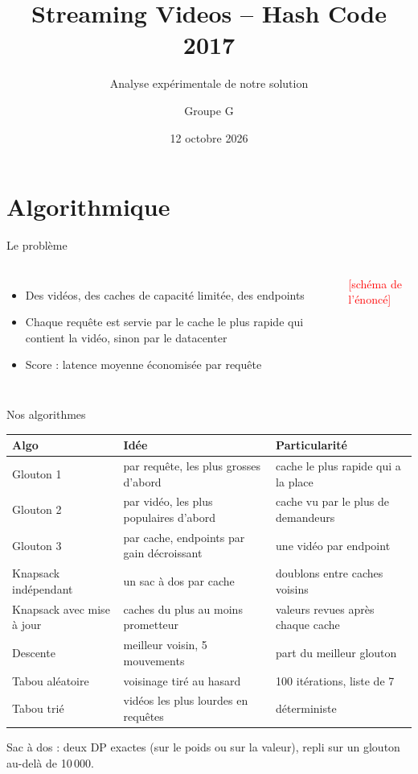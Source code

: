 \documentclass[aspectratio=169,11pt]{beamer}
\title{Streaming Videos -- Hash Code 2017}
\subtitle{Analyse expérimentale de notre solution}
\author{Groupe G \\ \afaire{noms}}
\date{12 octobre 2026}
\newcommand{\afaire}[1]{\textcolor{red}{[#1]}}
\begin{document}
\begin{frame}
  \titlepage
\end{frame}

\section{Algorithmique}

\begin{frame}{Le problème}
  \begin{columns}
    \begin{itemize}
      \item Des vidéos, des caches de capacité limitée, des endpoints
      \item Chaque requête est servie par le cache le plus rapide qui contient la vidéo, sinon par le datacenter
      \item Score : latence moyenne économisée par requête
    \end{itemize}
    \afaire{schéma de l'énoncé}
  \end{columns}
\end{frame}

\begin{frame}{Nos algorithmes}
  \small
  \begin{tabular}{@{}lll@{}}
    \toprule
    Algo & Idée & Particularité \\
    \midrule
    Glouton 1 & par requête, les plus grosses d'abord & cache le plus rapide qui a la place \\
    Glouton 2 & par vidéo, les plus populaires d'abord & cache vu par le plus de demandeurs \\
    Glouton 3 & par cache, endpoints par gain décroissant & une vidéo par endpoint \\
    \midrule
    Knapsack indépendant & un sac à dos par cache & doublons entre caches voisins \\
    Knapsack avec mise à jour & caches du plus au moins prometteur & valeurs revues après chaque cache \\
    \midrule
    Descente & meilleur voisin, 5 mouvements & part du meilleur glouton \\
    Tabou aléatoire & voisinage tiré au hasard & 100 itérations, liste de 7 \\
    Tabou trié & vidéos les plus lourdes en requêtes & déterministe \\
    \bottomrule
  \end{tabular}

  \medskip
  Sac à dos : deux DP exactes (sur le poids ou sur la valeur), repli sur un glouton au-delà de 10\,000.
\end{frame}
\end{document}
